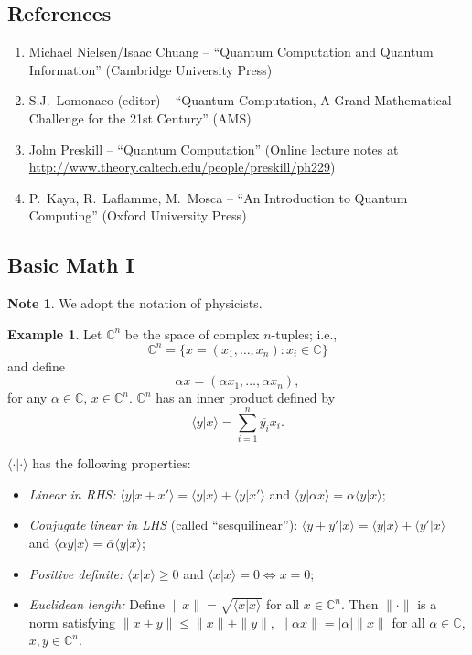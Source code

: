 \documentclass[12pt]{article}
\theoremstyle{definition}
\newtheorem*{example}{Example}
\newtheorem*{note}{Note}
\newcommand{\braket}[2]{\langle #1|#2\rangle}
\newcommand{\norm}[1]{\|#1\|}
\newcommand{\C}{\mathbb{C}}
\begin{document}
\subsection{References}

\begin{enumerate}
\item Michael Nielsen/Isaac Chuang -- ``Quantum Computation and Quantum Information'' (Cambridge University Press)
\item S.J.\ Lomonaco (editor) -- ``Quantum Computation, A Grand Mathematical Challenge for the 21st Century'' (AMS)
\item John Preskill -- ``Quantum Computation'' (Online lecture notes at \url{http://www.theory.caltech.edu/people/preskill/ph229})
\item P.\ Kaya, R.\ Laflamme, M.\ Mosca -- ``An Introduction to Quantum Computing'' (Oxford University Press)
\end{enumerate}

\subsection{Basic Math I}

\begin{note}
We adopt the notation of physicists.
\end{note}

\begin{example}
Let $\C^n$ be the space of complex $n$-tuples; i.e.,
\[
\C^n = \{x = (x_1,\ldots,x_n) : x_i \in \C\}
\]
and define
\[
\alpha x = (\alpha x_1,\ldots,\alpha x_n),
\]
for any $\alpha \in \C$, $x \in \C^n$. $\C^n$ has an inner product defined by
\[
\braket{y}{x} = \sum_{i=1}^n \overline{y_i} x_i.
\]
\end{example}

$\langle\cdot|\cdot\rangle$ has the following properties:
\begin{itemize}
\item \textit{Linear in RHS:} $\braket{y}{x+x'} = \braket{y}{x} + \braket{y}{x'}$ and $\braket{y}{\alpha x} = \alpha\braket{y}{x}$;
\item \textit{Conjugate linear in LHS} (called ``sesquilinear''): $\braket{y+y'}{x} = \braket{y}{x} + \braket{y'}{x}$ and $\braket{\alpha y}{x} = \overline{\alpha}\braket{y}{x}$;
\item \textit{Positive definite:} $\braket{x}{x} \geq 0$ and $\braket{x}{x} = 0 \Leftrightarrow x = 0$;
\item \textit{Euclidean length:} Define $\norm{x} = \sqrt{\braket{x}{x}}$ for all $x \in \C^n$. Then $\norm{\cdot}$ is a norm satisfying $\norm{x+y} \leq \norm{x}+\norm{y}$, $\norm{\alpha x} = |\alpha|\norm{x}$ for all $\alpha \in \C$, $x,y \in \C^n$.
\end{itemize}
\end{document}
